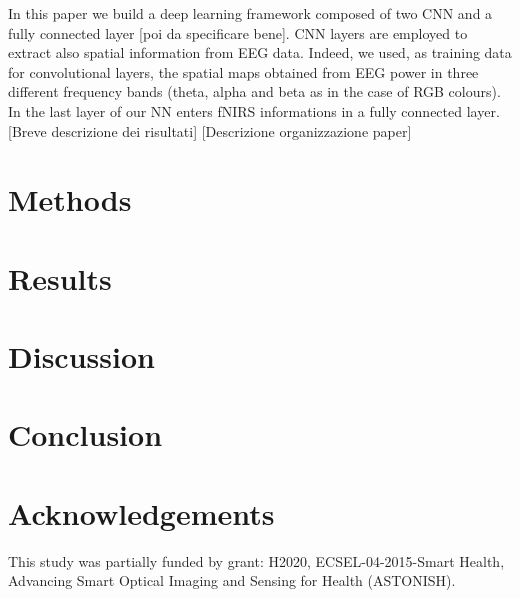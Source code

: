 \documentclass[12pt ]{iopart}
\begin{document}
 In this paper we build a deep learning framework composed of two CNN and a fully connected layer [poi da specificare bene]. CNN layers are employed to extract also spatial information from EEG data. Indeed, we used, as training data for convolutional layers, the spatial maps obtained from EEG power in three different frequency bands (theta, alpha and beta as in the case of RGB colours). In the last layer of our NN enters fNIRS informations in a fully connected layer. [Breve descrizione dei risultati]
[Descrizione organizzazione paper]



\section{Methods}

\section{Results}

\section{Discussion}

\section{Conclusion}

\section{Acknowledgements}
This study was partially funded by grant: H2020, ECSEL-04-2015-Smart Health, Advancing Smart Optical Imaging and Sensing for Health (ASTONISH).
 

\newpage
\printbibliography
\cleardoublepage
{}
\end{document}
